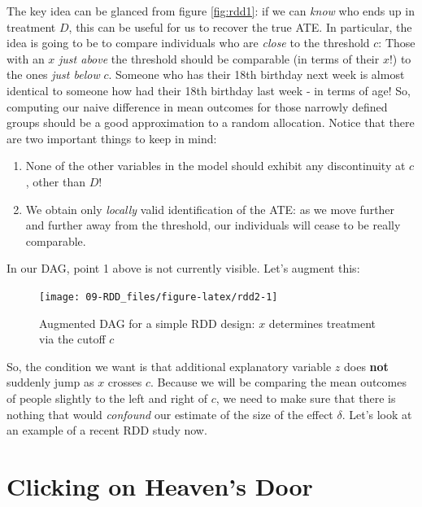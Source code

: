 \documentclass[]{book}
\providecommand{\tightlist}{%
  \setlength{\itemsep}{0pt}\setlength{\parskip}{0pt}}
\begin{document}
The key idea can be glanced from figure \ref{fig:rdd1}: if we can
\emph{know} who ends up in treatment \(D\), this can be useful for us to
recover the true ATE. In particular, the idea is going to be to compare
individuals who are \emph{close} to the threshold \(c\): Those with an
\(x\) \emph{just above} the threshold should be comparable (in terms of
their \(x\)!) to the ones \emph{just below} \(c\). Someone who has their
18th birthday next week is almost identical to someone how had their
18th birthday last week - in terms of age! So, computing our naive
difference in mean outcomes for those narrowly defined groups should be
a good approximation to a random allocation. Notice that there are two
important things to keep in mind:

\begin{enumerate}
\def\labelenumi{\arabic{enumi}.}
\tightlist
\item
  None of the other variables in the model should exhibit any
  discontinuity at \(c\), other than \(D\)!
\item
  We obtain only \emph{locally} valid identification of the ATE: as we
  move further and further away from the threshold, our individuals will
  cease to be really comparable.
\end{enumerate}

In our DAG, point 1 above is not currently visible. Let's augment this:

\begin{figure}

{\centering \texttt{[image: 09-RDD\_files/figure-latex/rdd2-1]} 

}

\caption{Augmented DAG for a simple RDD design: $x$ determines treatment via the cutoff $c$}\label{fig:rdd2}
\end{figure}

So, the condition we want is that additional explanatory variable \(z\)
does \textbf{not} suddenly jump as \(x\) crosses \(c\). Because we will
be comparing the mean outcomes of people slightly to the left and right
of \(c\), we need to make sure that there is nothing that would
\emph{confound} our estimate of the size of the effect \(\delta\). Let's
look at an example of a recent RDD study now.

\section{Clicking on Heaven's Door}\label{clicking-on-heavens-door}
\end{document}
